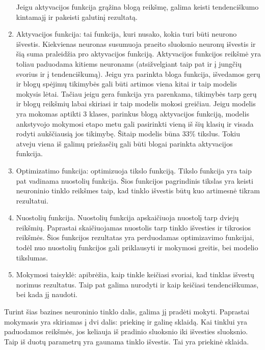 \documentclass{VUMIFInfKursinis}
\begin{document}
\begin{enumerate}
  Jeigu aktyvacijos funkcija grąžina blogą reikšmę, galima keisti tendenciškumo kintamajį ir
  pakeisti galutinį rezultatą.
  \item Aktyvacijos funkcija: tai funkcija, kuri nusako, kokia turi būti neurono išvestis. Kiekvienas neuronas
  susumuoja praeito sluoksnio neuronų išvestis ir šią suma praleidžia pro aktyvacijos funkciją.
  Aktyvacijos funkcijos reikšmė yra toliau paduodama kitiems neuronams (atsižvelgiant taip pat ir į
  jungčių svorius ir į tendenciškumą).
    Jeigu yra parinkta bloga funkcija, išvedamos gerų ir blogų spėjimų tikimybės gali būti artimos viena kitai ir taip modelis mokysis lėtai. Tačiau jeigu gera funkcija yra parenkama, tikimybės tarp gerų ir blogų reikšmių labai skiriasi ir taip modelis mokosi greičiau.
    Jeigu modelis yra mokomas aptikti 3 klases, parinkus blogą aktyvacijos
    funkciją, modelis ankstyvojo mokymosi etapo metu gali pasirinkti vieną
    iš šių klasių ir visada rodyti aukščiausią jos tikimybę. Šitaip modelis būna 33\% tikslus. Tokiu atveju viena iš galimų priežasčių gali būti blogai parinkta aktyvacijos funkcija. 
  \item Optimizatimo funkcija: optimizuoja tikslo funkciją. Tikslo funkcija yra taip pat vadinama nuostolių funkcija.
  Šios funkcijos pagrindinis tikslas yra keisti neuroninio tinklo reikšmes taip, kad tinklo išvestis būtų
  kuo artimesnė tikram rezultatui.
  \item Nuostolių funkcija. Nuostolių funkcija apskaičiuoja nuostolį tarp dviejų reikšmių. Paprastai skaičiuojamas nuostolis tarp tinklo išvesties ir tikrosios reikšmės. Šios funkcijos rezultatas yra perduodamas optimizavimo funkcijai, todėl nuo nuostolių funkcijos gali priklausyti ir mokymosi greitis, bei modelio tikslumas.
  \item Mokymosi taisyklė: apibrėžia, kaip tinkle keičiasi svoriai, kad tinklas išvestų norimus rezultatus.
  Taip pat galima nurodyti ir kaip keičiasi tendenciškumas, bei kada jį naudoti.
\end{enumerate}
\par
Turint šias bazines neuroninio tinklo dalis, galima jį pradėti mokyti. Paprastai mokymasis
yra skiriamas į dvi dalis: priekinę ir galinę sklaidą.
Kai tinklui yra paduodamos reikšmės, jos keliauja iš pradinio sluoksnio iki išvesties sluoksnio. Taip iš duotų parametrų yra gaunama tinklo išvestis. Tai
yra priekinė sklaida.
\end{document}
